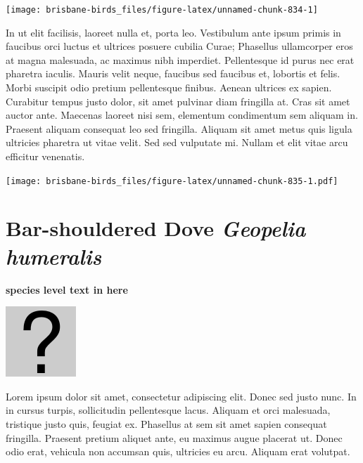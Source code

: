 \documentclass[]{book}
\let\origfigure\figure
\let\endorigfigure\endfigure
\renewenvironment{figure}[1][2] {
  \expandafter\origfigure\expandafter[H]
} {
  \endorigfigure
}
\begin{document}
\begin{figure}
\texttt{[image: brisbane-birds\_files/figure-latex/unnamed-chunk-834-1]} \caption{insert figure caption}\label{fig:unnamed-chunk-834}
\end{figure}

In ut elit facilisis, laoreet nulla et, porta leo. Vestibulum ante ipsum
primis in faucibus orci luctus et ultrices posuere cubilia Curae;
Phasellus ullamcorper eros at magna malesuada, ac maximus nibh
imperdiet. Pellentesque id purus nec erat pharetra iaculis. Mauris velit
neque, faucibus sed faucibus et, lobortis et felis. Morbi suscipit odio
pretium pellentesque finibus. Aenean ultrices ex sapien. Curabitur
tempus justo dolor, sit amet pulvinar diam fringilla at. Cras sit amet
auctor ante. Maecenas laoreet nisi sem, elementum condimentum sem
aliquam in. Praesent aliquam consequat leo sed fringilla. Aliquam sit
amet metus quis ligula ultricies pharetra ut vitae velit. Sed sed
vulputate mi. Nullam et elit vitae arcu efficitur venenatis.

\begin{figure}
\centering
\texttt{[image: brisbane-birds\_files/figure-latex/unnamed-chunk-835-1.pdf]}
\caption{\label{fig:unnamed-chunk-835}insert figure caption}
\end{figure}

\section{\texorpdfstring{Bar-shouldered Dove \emph{Geopelia
humeralis}}{Bar-shouldered Dove Geopelia humeralis}}\label{bar-shouldered-dove-geopelia-humeralis}

\textbf{species level text in here}

\begin{figure}
\centering
\includegraphics{assets/missing.png}
\caption{No image for species}
\end{figure}

Lorem ipsum dolor sit amet, consectetur adipiscing elit. Donec sed justo
nunc. In in cursus turpis, sollicitudin pellentesque lacus. Aliquam et
orci malesuada, tristique justo quis, feugiat ex. Phasellus at sem sit
amet sapien consequat fringilla. Praesent pretium aliquet ante, eu
maximus augue placerat ut. Donec odio erat, vehicula non accumsan quis,
ultricies eu arcu. Aliquam erat volutpat.
\end{document}
